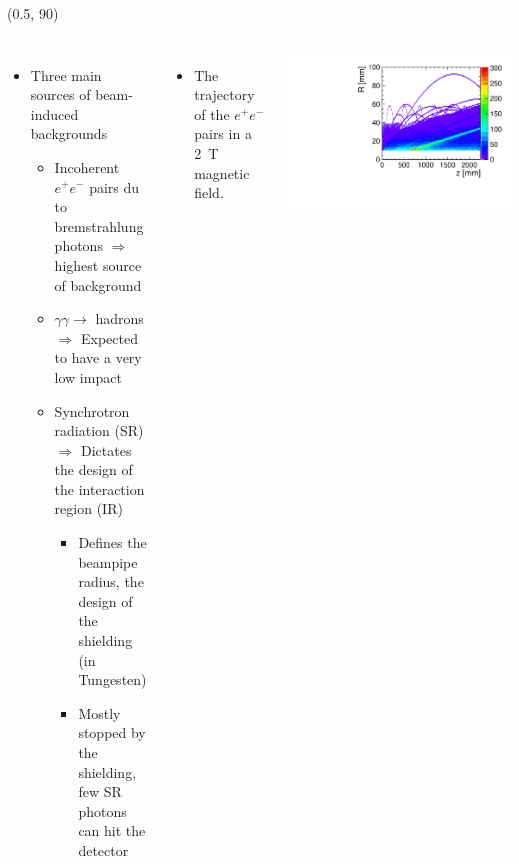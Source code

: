 \documentclass[final,xcolor={dvipsnames,svgnames,x11names,table}]{beamer}
\begin{document}
\begin{frame}
\begin{textblock}{82}
\begin{tcolorbox}[title=The drift chamber]
  \end{tcolorbox}
\end{textblock}


\begin{textblock}{40}(0.5, 90)
  \begin{tcolorbox}[title=Main sources of beam-induced backgrounds]

  \begin{columns}
    \begin{itemize}
      \item Three main sources of beam-induced backgrounds
      \begin{itemize}
        \item Incoherent $e^+e^-$ pairs du to bremstrahlung photons $\Rightarrow$ highest source of background
        \item $\gamma\gamma\rightarrow$ hadrons $\Rightarrow$ Expected to have a very low impact
        \item Synchrotron radiation (SR) $\Rightarrow$ Dictates the design of the interaction region (IR)
          \begin{itemize}
            \item Defines the beampipe radius, the design of the shielding (in Tungesten)
            \item Mostly stopped by the shielding, few SR photons can hit the detector
          \end{itemize}
      \end{itemize}
    \end{itemize}

    \begin{itemize}
      \item The trajectory of the $e^+e^−$ pairs in a 2~T magnetic field.
    \end{itemize}
    \centering
    \includegraphics[width=\textwidth]{../figures/pairs_R_Z}
  \end{columns}


\end{tcolorbox}
\end{textblock}
\end{frame}
\end{document}
